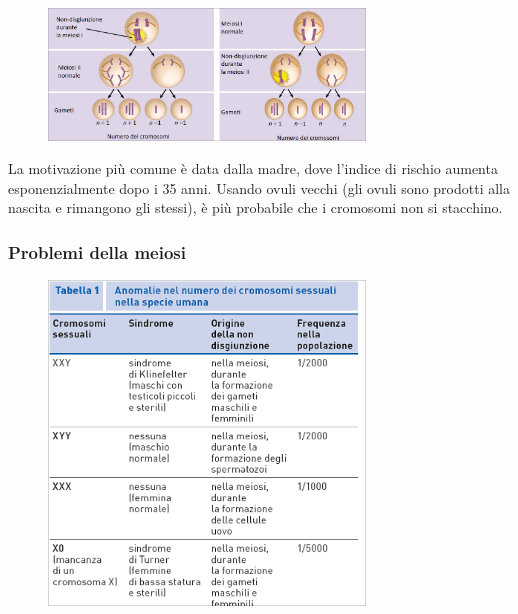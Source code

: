 \documentclass[a4paper]{article}
\begin{document}
\begin{center}
\begin{figure}[ht]
    \centering
    \includegraphics[width=0.75\textwidth]{./trisomia21}
\end{figure}
\end{center}

La motivazione più comune è data dalla madre, dove l'indice di rischio aumenta
esponenzialmente dopo i 35 anni.
Usando ovuli vecchi (gli ovuli sono prodotti alla nascita e rimangono gli stessi),
è più probabile che i cromosomi non si stacchino.

\pagebreak

\subsubsection{Problemi della meiosi}

\begin{center}
\begin{figure}[ht]
    \centering
    \includegraphics[width=0.75\textwidth]{./anom}
\end{figure}
\end{center}
\end{document}

